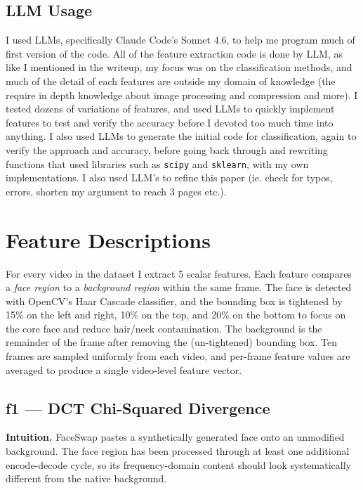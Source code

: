 \documentclass{article}
\begin{document}
\subsection*{LLM Usage}
I used LLMs, specifically Claude Code's Sonnet 4.6, to help me program much of first version of the code. All of the feature extraction code is done by LLM, as like I mentioned in the writeup, my focus was on the classification methods, and much of the detail of each features are outside my domain of knowledge (the require in depth knowledge about image processing and compression and more). I tested dozens of variations of features, and used LLMs to quickly implement features to test and verify the accuracy before I devoted too much time into anything. I also used LLMs to generate the initial code for classification, again to verify the approach and accuracy, before going back through and rewriting functions that used libraries such as \verb|scipy| and \verb|sklearn|, with my own implementations. I also used LLM's to refine this paper (ie. check for typos, errors, shorten my argument to reach 3 pages etc.). 

\newpage
\appendix
\section{Feature Descriptions}
\label{app:features}

For every video in the dataset I extract 5 scalar features. Each feature compares a \textit{face region} to a \textit{background region} within the same frame. The face is detected with OpenCV's Haar Cascade classifier, and the bounding box is tightened by 15\% on the left and right, 10\% on the top, and 20\% on the bottom to focus on the core face and reduce hair/neck contamination. The background is the remainder of the frame after removing the (un-tightened) bounding box. Ten frames are sampled uniformly from each video, and per-frame feature values are averaged to produce a single video-level feature vector.

\subsection*{f1 — DCT Chi-Squared Divergence}

\textbf{Intuition.} FaceSwap pastes a synthetically generated face onto an unmodified background. The face region has been processed through at least one additional encode-decode cycle, so its frequency-domain content should look systematically different from the native background.
\end{document}
